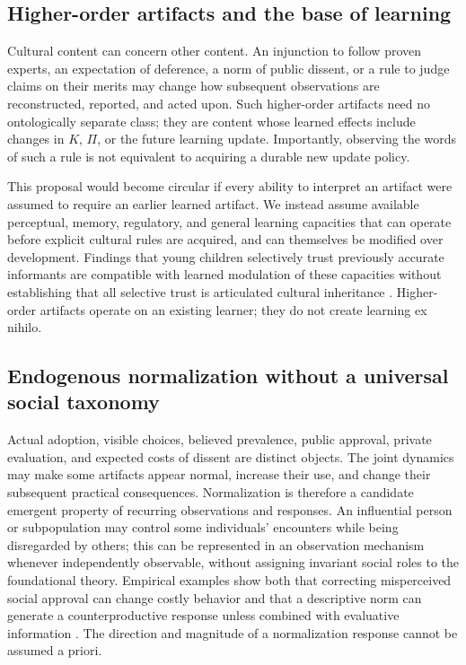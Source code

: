 \documentclass[11pt,a4paper]{article}
\begin{document}
\subsection{Higher-order artifacts and the base of learning}
Cultural content can concern other content. An injunction to follow proven experts, an expectation of deference, a norm of public dissent, or a rule to judge claims on their merits may change how subsequent observations are reconstructed, reported, and acted upon. Such higher-order artifacts need no ontologically separate class; they are content whose learned effects include changes in $K$, $\Pi$, or the future learning update. Importantly, observing the words of such a rule is not equivalent to acquiring a durable new update policy.

This proposal would become circular if every ability to interpret an artifact were assumed to require an earlier learned artifact. We instead assume available perceptual, memory, regulatory, and general learning capacities that can operate before explicit cultural rules are acquired, and can themselves be modified over development. Findings that young children selectively trust previously accurate informants are compatible with learned modulation of these capacities without establishing that all selective trust is articulated cultural inheritance \citep{koenig2004}. Higher-order artifacts operate on an existing learner; they do not create learning ex nihilo.

\subsection{Endogenous normalization without a universal social taxonomy}
Actual adoption, visible choices, believed prevalence, public approval, private evaluation, and expected costs of dissent are distinct objects. The joint dynamics may make some artifacts appear normal, increase their use, and change their subsequent practical consequences. Normalization is therefore a candidate emergent property of recurring observations and responses. An influential person or subpopulation may control some individuals' encounters while being disregarded by others; this can be represented in an observation mechanism whenever independently observable, without assigning invariant social roles to the foundational theory. Empirical examples show both that correcting misperceived social approval can change costly behavior \citep{bursztyn2020} and that a descriptive norm can generate a counterproductive response unless combined with evaluative information \citep{schultz2007}. The direction and magnitude of a normalization response cannot be assumed a priori.
\end{document}
